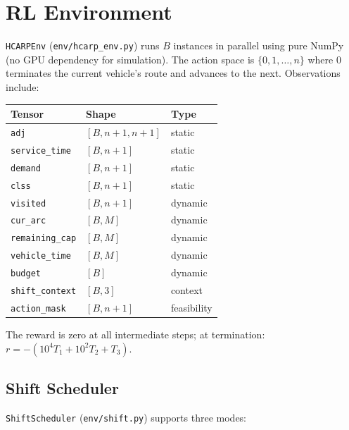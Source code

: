 \documentclass[11pt,a4paper]{article}
\begin{document}
\section{RL Environment}

\texttt{HCARPEnv} (\texttt{env/hcarp\_env.py}) runs $B$ instances in parallel
using pure NumPy (no GPU dependency for simulation). The action space is
$\{0, 1, \ldots, n\}$ where $0$ terminates the current vehicle's route and
advances to the next. Observations include:

\begin{center}
\begin{tabular}{lll}
\toprule
\textbf{Tensor} & \textbf{Shape} & \textbf{Type} \\
\midrule
\texttt{adj}            & $[B, n{+}1, n{+}1]$ & static \\
\texttt{service\_time}  & $[B, n{+}1]$         & static \\
\texttt{demand}         & $[B, n{+}1]$         & static \\
\texttt{clss}           & $[B, n{+}1]$         & static \\
\texttt{visited}        & $[B, n{+}1]$         & dynamic \\
\texttt{cur\_arc}       & $[B, M]$             & dynamic \\
\texttt{remaining\_cap} & $[B, M]$             & dynamic \\
\texttt{vehicle\_time}  & $[B, M]$             & dynamic \\
\texttt{budget}         & $[B]$                & dynamic \\
\texttt{shift\_context} & $[B, 3]$             & context \\
\texttt{action\_mask}   & $[B, n{+}1]$         & feasibility \\
\bottomrule
\end{tabular}
\end{center}

The reward is zero at all intermediate steps; at termination:
$r = -(10^4 T_1 + 10^2 T_2 + T_3)$.

\subsection{Shift Scheduler}

\texttt{ShiftScheduler} (\texttt{env/shift.py}) supports three modes:
\end{document}
